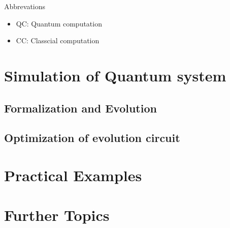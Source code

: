 \documentclass[10pt]{book}
\begin{document}
Abbrevations

\begin{itemize}
    \item QC: Quantum computation
    \item CC: Classcial computation
\end{itemize}

\newpage

\part{Simulation of Quantum system}
\chapter{Formalization and Evolution}





\newpage
\chapter{Optimization of evolution circuit}


\newpage
\part{Practical Examples}









\newpage
\part{Further Topics}

\newpage


\end{document}
